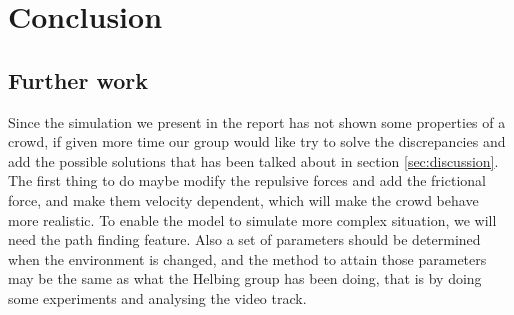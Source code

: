 \section{Conclusion}
\label{sec:conclusion}

\subsection{Further work}
Since the simulation we present in the report has not shown some properties of 
a crowd, if given more time our group would like try to solve the 
discrepancies and add the possible solutions that has been talked about in 
section \ref{sec:discussion}. The first thing to do maybe modify the repulsive 
forces and add the frictional force, and make them velocity dependent, which 
will make the crowd behave more realistic.  To enable the model to simulate 
more complex situation, we will need the path finding feature. Also a set of 
parameters should be determined when the environment is changed, and the 
method to attain those parameters may be the same as what the Helbing group 
has been doing, that is by doing some experiments and analysing the video 
track.
